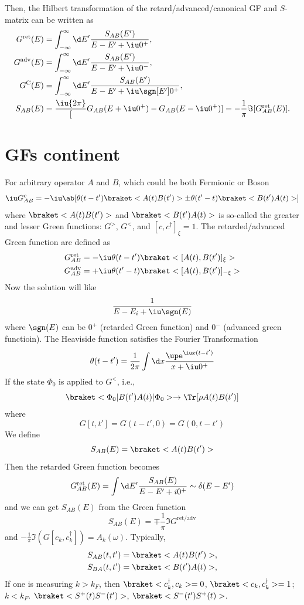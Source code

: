 Then, the Hilbert transformation of the retard/advanced/canonical GF and $S$-matrix can be written as
\begin{align}
  G^\text{ret}(E) & = \int_{-\infty}^{\infty} \d E' \frac{S_{AB}(E')}{E - E' + \iu 0^+},\\
  G^\text{adv}(E) & = \int_{-\infty}^{\infty} \d E' \frac{S_{AB}(E')}{E - E' + \iu 0^-},\\
  G^\text{C}(E) & = \int_{-\infty}^{\infty} \d E' \frac{S_{AB}(E')}{E - E' + \iu\sgn[E'] 0^+},\\
  S_{AB}(E) & = \frac\iu{2\pi} [G_{AB}(E + \iu 0^+) - G_{AB}(E - \iu 0^+)]
= -\frac1\pi \Im[G_{AB}^\text{ret}(E)].
\end{align}

\section{GFs continent}

For arbitrary operator $A$ and $B$, which could be both Fermionic or Boson
\begin{equation}
  \iu G_{AB}^c = -\iu\ab[\theta(t - t') \braket<A(t) B(t')> \pm
    \theta(t' - t) \braket<B(t')A(t)>]
\end{equation}
where $\braket<A(t)B(t')>$ and $\braket<B(t')A(t)>$ is so-called the greater and lesser Green functions: $G^>$, $G^<$, and $[c,c^\dagger]_\xi = 1$.
The retarded/advanced Green function are defined as
\begin{align}
  G_{AB}^\text{ret} & = -\iu\theta(t - t') \braket<[A(t), B(t')]_\xi>\\
  G_{AB}^\text{adv} & = +\iu\theta(t' - t) \braket<[A(t), B(t')]_{-\xi}>
\end{align}
Now the solution will like
\[
  \frac{1}{E - E_i + \iu\sgn(E)}
\]
where $\sgn(E)$ can be $0^+$ (retarded Green function) and $0^-$ (advanced green functioin). The Heaviside function satisfies the Fourier Transformation
\[
  \theta(t - t') = \frac1{2\pi} \int \d x \frac{\upe^{\iu x(t-t')}}{x + \iu 0^+}
\]
If the state $\Phi_0$ is applied to $G^<$, i.e.,
\[
  \braket<\Phi_0|B(t')A(t)|\Phi_0> \to \Tr[\rho A(t)B(t')]
\]
where
\[
  G[t,t'] = G(t - t', 0) = G(0, t - t')
\]
We define
\begin{equation}
  S_{AB}(E) = \braket<A(t)B(t')>
\end{equation}
Then the retarded Green function becomes
\begin{equation}
  G_{AB}^\text{ret}(E) = \int \d E' \frac{S_{AB}(E)}{E - E' + i0^+} \sim \delta(E - E')
\end{equation}
and we can get $S_{AB}(E)$ from the Green function
\begin{equation}
  S_{AB}(E) = \mp\frac1\pi \Im G^\text{ret/adv}
\end{equation}
and $-\frac1\pi \Im(G[c_k, c_k^\dagger]) = A_k(\omega)$.
Typically,
\begin{align}
  S_{AB}(t,t') & = \braket<A(t)B(t')>,\\
  S_{BA}(t,t') & = \braket<B(t')A(t)>,
\end{align}
If one is measuring $k > k_F$, then $\braket<c_k^\dagger, c_k> = 0$,
$\braket<c_k, c_k^\dagger> = 1$; $k < k_F$.
$\braket<S^+(t)S^-(t')>$,
$\braket<S^-(t')S^+(t)>$.

